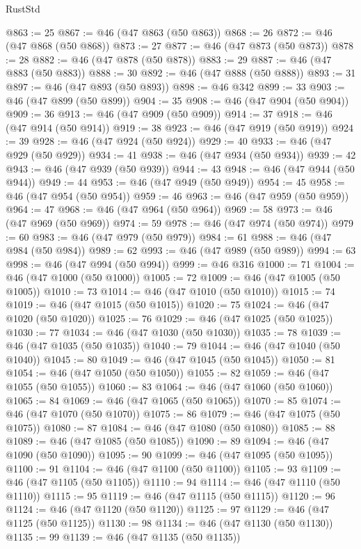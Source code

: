 \begin{lexlean}{RustStd}
\begin{coremodule}
@863 := 25
@867 := @46 (@47 @863 (@50 @863))
@868 := 26
@872 := @46 (@47 @868 (@50 @868))
@873 := 27
@877 := @46 (@47 @873 (@50 @873))
@878 := 28
@882 := @46 (@47 @878 (@50 @878))
@883 := 29
@887 := @46 (@47 @883 (@50 @883))
@888 := 30
@892 := @46 (@47 @888 (@50 @888))
@893 := 31
@897 := @46 (@47 @893 (@50 @893))
@898 := @46 @342
@899 := 33
@903 := @46 (@47 @899 (@50 @899))
@904 := 35
@908 := @46 (@47 @904 (@50 @904))
@909 := 36
@913 := @46 (@47 @909 (@50 @909))
@914 := 37
@918 := @46 (@47 @914 (@50 @914))
@919 := 38
@923 := @46 (@47 @919 (@50 @919))
@924 := 39
@928 := @46 (@47 @924 (@50 @924))
@929 := 40
@933 := @46 (@47 @929 (@50 @929))
@934 := 41
@938 := @46 (@47 @934 (@50 @934))
@939 := 42
@943 := @46 (@47 @939 (@50 @939))
@944 := 43
@948 := @46 (@47 @944 (@50 @944))
@949 := 44
@953 := @46 (@47 @949 (@50 @949))
@954 := 45
@958 := @46 (@47 @954 (@50 @954))
@959 := 46
@963 := @46 (@47 @959 (@50 @959))
@964 := 47
@968 := @46 (@47 @964 (@50 @964))
@969 := 58
@973 := @46 (@47 @969 (@50 @969))
@974 := 59
@978 := @46 (@47 @974 (@50 @974))
@979 := 60
@983 := @46 (@47 @979 (@50 @979))
@984 := 61
@988 := @46 (@47 @984 (@50 @984))
@989 := 62
@993 := @46 (@47 @989 (@50 @989))
@994 := 63
@998 := @46 (@47 @994 (@50 @994))
@999 := @46 @316
@1000 := 71
@1004 := @46 (@47 @1000 (@50 @1000))
@1005 := 72
@1009 := @46 (@47 @1005 (@50 @1005))
@1010 := 73
@1014 := @46 (@47 @1010 (@50 @1010))
@1015 := 74
@1019 := @46 (@47 @1015 (@50 @1015))
@1020 := 75
@1024 := @46 (@47 @1020 (@50 @1020))
@1025 := 76
@1029 := @46 (@47 @1025 (@50 @1025))
@1030 := 77
@1034 := @46 (@47 @1030 (@50 @1030))
@1035 := 78
@1039 := @46 (@47 @1035 (@50 @1035))
@1040 := 79
@1044 := @46 (@47 @1040 (@50 @1040))
@1045 := 80
@1049 := @46 (@47 @1045 (@50 @1045))
@1050 := 81
@1054 := @46 (@47 @1050 (@50 @1050))
@1055 := 82
@1059 := @46 (@47 @1055 (@50 @1055))
@1060 := 83
@1064 := @46 (@47 @1060 (@50 @1060))
@1065 := 84
@1069 := @46 (@47 @1065 (@50 @1065))
@1070 := 85
@1074 := @46 (@47 @1070 (@50 @1070))
@1075 := 86
@1079 := @46 (@47 @1075 (@50 @1075))
@1080 := 87
@1084 := @46 (@47 @1080 (@50 @1080))
@1085 := 88
@1089 := @46 (@47 @1085 (@50 @1085))
@1090 := 89
@1094 := @46 (@47 @1090 (@50 @1090))
@1095 := 90
@1099 := @46 (@47 @1095 (@50 @1095))
@1100 := 91
@1104 := @46 (@47 @1100 (@50 @1100))
@1105 := 93
@1109 := @46 (@47 @1105 (@50 @1105))
@1110 := 94
@1114 := @46 (@47 @1110 (@50 @1110))
@1115 := 95
@1119 := @46 (@47 @1115 (@50 @1115))
@1120 := 96
@1124 := @46 (@47 @1120 (@50 @1120))
@1125 := 97
@1129 := @46 (@47 @1125 (@50 @1125))
@1130 := 98
@1134 := @46 (@47 @1130 (@50 @1130))
@1135 := 99
@1139 := @46 (@47 @1135 (@50 @1135))

\end{coremodule}
\end{lexlean}
